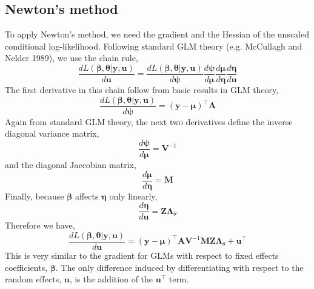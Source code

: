 \documentclass{jss}
\begin{document}
\subsection{Newton's method}

To apply Newton's method, we need the gradient and the Hessian of the
unscaled conditional log-likelihood. Following standard GLM theory
(e.g. McCullagh and Nelder 1989), we use the chain rule,
\begin{displaymath}
  \frac{d L(\bm\beta, \bm\theta | \bm y, \bm u)}{d \bm u} = 
  \frac{d L(\bm\beta, \bm\theta | \bm y, \bm u)}{d \bm\psi}
  \frac{d \bm\psi}{d \bm\mu}
  \frac{d \bm\mu}{d \bm\eta}
  \frac{d \bm\eta}{d \bm u}
\end{displaymath}
The first derivative in this chain follow from basic results in GLM
theory,
\begin{displaymath}
  \frac{d L(\bm\beta, \bm\theta | \bm y, \bm u)}{d \bm\psi} = 
  (\bm y - \bm\mu)^\top \bm A
\end{displaymath}
Again from standard GLM theory, the next two derivatives define the
inverse diagonal variance matrix,
\begin{displaymath}
  \frac{d \bm\psi}{d \bm\mu} = \bm V^{-1}
\end{displaymath}
and the diagonal Jaccobian matrix,
\begin{displaymath}
\frac{d \bm\mu}{d \bm\eta} = \bm M
\end{displaymath}
Finally, because $\bm\beta$ affects $\bm\eta$ only linearly,
\begin{displaymath}
  \frac{d \bm\eta}{d \bm u} = \bm Z \bm\Lambda_\theta
\end{displaymath}
Therefore we have,
\begin{equation}
  \frac{d L(\bm\beta, \bm\theta | \bm y, \bm u)}{d \bm u} = 
  (\bm y - \bm\mu)^\top \bm A
  \bm V^{-1}
  \bm M
  \bm Z \bm\Lambda_\theta +
  \bm u^\top
\label{eq:dPDEVdu}
\end{equation}
This is very similar to the gradient for GLMs with respect to fixed
effects coefficients, $\bm\beta$. The only difference induced by
differentiating with respect to the random effects, $\bm u$, is the
addition of the $\bm u^\top$ term.
\end{document}
